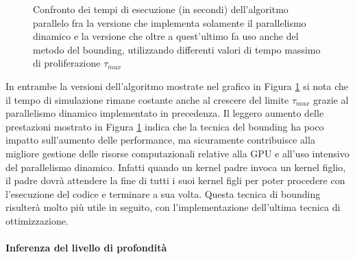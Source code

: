\begin{figure}[t]
    \centering
    \caption{Confronto dei tempi di esecuzione (in secondi) dell'algoritmo
    parallelo fra la versione che implementa solamente il parallelismo dinamico
    e la versione che oltre a quest'ultimo fa uso anche del metodo del bounding,
    utilizzando differenti valori di tempo massimo di proliferazione
    $\tau_{max}$}
    \label{chart:dynamic-bounding}
\end{figure}
In entrambe la versioni dell'algoritmo mostrate nel grafico in Figura
\ref{chart:dynamic-bounding} si nota che il tempo di simulazione
rimane costante anche al crescere del limite $\tau_{max}$ grazie al parallelismo
dinamico implementato in precedenza.
Il leggero aumento delle prestazioni mostrato in Figura
\ref{chart:dynamic-bounding} indica che la tecnica
del bounding ha poco impatto sull'aumento delle performance, ma
sicuramente contribuisce alla migliore gestione delle risorse computazionali
relative alla GPU e all'uso intensivo del parallelismo dinamico. Infatti
quando un kernel padre invoca un kernel figlio,
il padre dovrà attendere la fine di tutti i suoi kernel figli per
poter procedere con l'esecuzione del codice e terminare a sua volta.
Questa tecnica di bounding risulterà molto più utile in seguito, con
l'implementazione dell'ultima tecnica di ottimizzazione.

\paragraph{Inferenza del livello di profondità}\mbox{}

